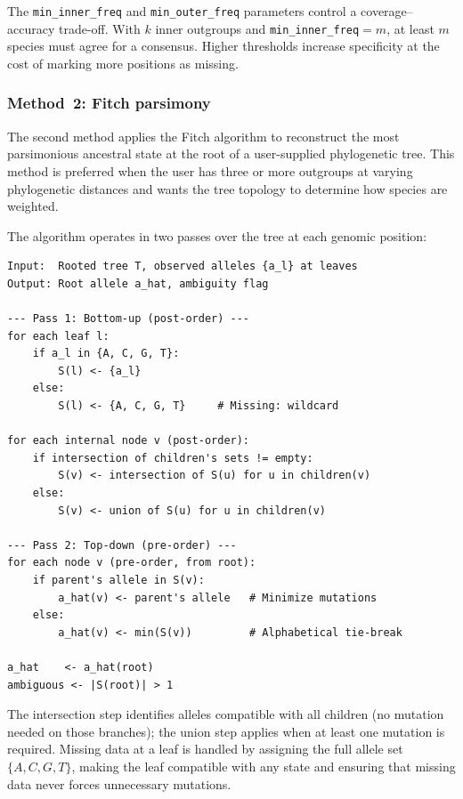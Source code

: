 \documentclass[11pt,a4paper]{article}
\begin{document}
The \texttt{min\_inner\_freq} and \texttt{min\_outer\_freq} parameters
control a coverage--accuracy trade-off. With $k$ inner outgroups and
\texttt{min\_inner\_freq}$=m$, at least $m$ species must agree for a
consensus. Higher thresholds increase specificity at the cost of marking more
positions as missing.

\subsubsection{Method~2: Fitch parsimony}
\label{sec:parsimony}

The second method applies the Fitch algorithm \citep{Fitch1971} to
reconstruct the most parsimonious ancestral state at the root of a
user-supplied phylogenetic tree. This method is preferred when the user has
three or more outgroups at varying phylogenetic distances and wants the tree
topology to determine how species are weighted.

The algorithm operates in two passes over the tree at each genomic position:

\begin{lstlisting}[caption={Fitch parsimony for ancestral state reconstruction
(pseudocode).},label={alg:fitch},language={},numbers=none,frame=single,
basicstyle=\ttfamily\small]
Input:  Rooted tree T, observed alleles {a_l} at leaves
Output: Root allele a_hat, ambiguity flag

--- Pass 1: Bottom-up (post-order) ---
for each leaf l:
    if a_l in {A, C, G, T}:
        S(l) <- {a_l}
    else:
        S(l) <- {A, C, G, T}     # Missing: wildcard

for each internal node v (post-order):
    if intersection of children's sets != empty:
        S(v) <- intersection of S(u) for u in children(v)
    else:
        S(v) <- union of S(u) for u in children(v)

--- Pass 2: Top-down (pre-order) ---
for each node v (pre-order, from root):
    if parent's allele in S(v):
        a_hat(v) <- parent's allele   # Minimize mutations
    else:
        a_hat(v) <- min(S(v))         # Alphabetical tie-break

a_hat    <- a_hat(root)
ambiguous <- |S(root)| > 1
\end{lstlisting}

The intersection step identifies alleles compatible with all children (no
mutation needed on those branches); the union step applies when at least one
mutation is required. Missing data at a leaf is handled by assigning the full
allele set $\{A,C,G,T\}$, making the leaf compatible with any state and
ensuring that missing data never forces unnecessary mutations.
\end{document}
